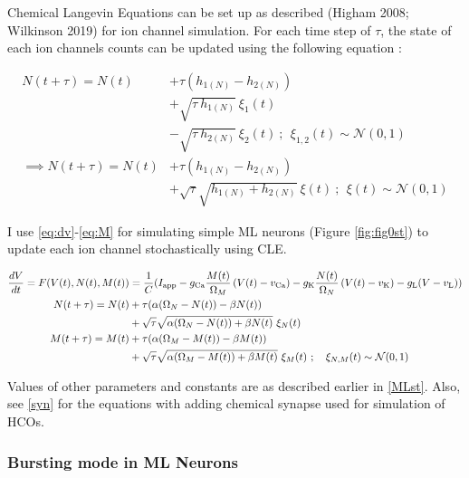 \documentclass[
]{article}
\begin{document}
Chemical Langevin Equations can be set up as described (Higham 2008; Wilkinson 2019) for ion channel simulation. For each time step of \(\tau\), the state of each ion channels counts can be updated using the following equation :

\begin{equation}
\begin{split}
N(t+\tau) = N(t) &+ \tau (h_{1(N)}-h_{2(N)}) 
\\ &+ \sqrt{\tau\  h_{1(N)}}\ \xi_1(t) 
\\ &- \sqrt{\tau\  h_{2(N)}}\ \xi_2(t)\ ;\ \ \xi_{1,2}(t) \sim \mathcal{N}(0,1)
\\ \implies N(t+\tau) = N(t) &+ \tau (h_{1(N)}-h_{2(N)}) 
\\ &+ \sqrt{\tau} \sqrt{h_{1(N)}+h_{2(N)}}\ \xi(t)\ ;\ \ \xi(t) \sim \mathcal{N}(0,1)
\end{split}
\end{equation}

I use \eqref{eq:dv}-\eqref{eq:M} for simulating simple ML neurons (Figure \ref{fig:fig0st}) to update each ion channel stochastically using CLE.

\begin{align}
\label{eq:dv} \frac{dV}{dt} =  F(V(t),N(t),M(t)) &= \frac1C ( I_{\rm app} - g_{\rm Ca} 
    \frac{M(t)}{\Omega_M} \left(V(t) - v_{\rm Ca}\right) - g_{\rm K} 
    \frac{N(t)}{\Omega_N} \left(V(t) - v_{\rm K}\right) - g_{\rm L}(V - v_{\rm L}) )
\\ \nonumber N(t+\tau) = N(t) &+ \tau (\alpha (\Omega_N - N(t)) - \beta N(t)) 
\\ \label{eq:N} &+ \sqrt{\tau} \sqrt{\alpha (\Omega_N - N(t)) + \beta N(t)}\ \xi_N(t)
\\ \nonumber M(t+\tau) = M(t) &+ \tau (\alpha (\Omega_M - M(t)) - \beta M(t)) 
\\ \label{eq:M} &+ \sqrt{\tau} \sqrt{\alpha (\Omega_M - M(t)) + \beta M(t)}\ \xi_M(t)\ ;
    \ \ \ \xi_{N,M}(t) \sim \mathcal{N}(0,1)
\end{align}

Values of other parameters and constants are as described earlier in \ref{MLst}. Also, see \ref{syn} for the equations with adding chemical synapse used for simulation of HCOs.

\hypertarget{Bpar}{%
\subsubsection{Bursting mode in ML Neurons}\label{Bpar}}
\end{document}
